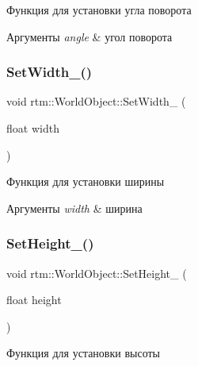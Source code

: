 Функция для установки угла поворота 


\begin{DoxyParams}{Аргументы}
{\em angle} & угол поворота \\
\hline
\end{DoxyParams}
\mbox{\label{classrtm_1_1_world_object_ad11ace9402b562b5c2aa6817c4b1cc9f}} 
\subsubsection{\texorpdfstring{Set\+Width\+\_\+()}{SetWidth\_()}}
{\footnotesize\ttfamily void rtm\+::\+World\+Object\+::\+Set\+Width\+\_\+ (\begin{DoxyParamCaption}\item[{float}]{width }\end{DoxyParamCaption})\hspace{0.3cm}{\ttfamily [protected]}}



Функция для установки ширины 


\begin{DoxyParams}{Аргументы}
{\em width} & ширина \\
\hline
\end{DoxyParams}
\mbox{\label{classrtm_1_1_world_object_a60904037c13f9cf151cd28f040ac5f02}} 
\subsubsection{\texorpdfstring{Set\+Height\+\_\+()}{SetHeight\_()}}
{\footnotesize\ttfamily void rtm\+::\+World\+Object\+::\+Set\+Height\+\_\+ (\begin{DoxyParamCaption}\item[{float}]{height }\end{DoxyParamCaption})\hspace{0.3cm}{\ttfamily [protected]}}



Функция для установки высоты 


